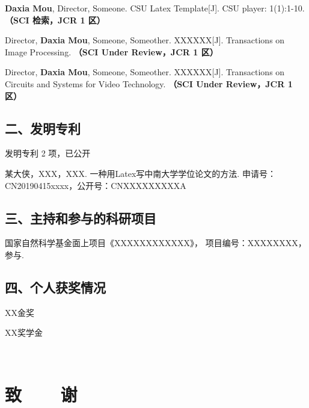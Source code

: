 \else
\begin{enumerate}[label={[\arabic*]},itemindent=2em,wide]
\item \textbf{Daxia Mou}, Director, Someone. CSU Latex Template[J]. CSU player: 1(1):1-10. {\bfseries \heiti（SCI 检索，JCR 1 区）}
\item Director, \textbf{Daxia Mou}, Someone, Someother. XXXXXX[J]. Transactions on Image Processing. {\bfseries \heiti（SCI Under Review，JCR 1 区）}
\item Director, \textbf{Daxia Mou}, Someone, Someother. XXXXXX[J]. Transactions on Circuits and Systems for Video Technology. {\bfseries \heiti（SCI Under Review，JCR 1 区）}
\end{enumerate}
\fi

\vspace{22pt}
\subsection*{二、发明专利}
\ifblindreview
发明专利 2 项，已公开
\else
\begin{enumerate}[label={[\arabic*]},itemindent=2em,wide]
\item 某大侠，XXX，XXX. 一种用Latex写中南大学学位论文的方法. 申请号：CN20190415xxxx，公开号：CNXXXXXXXXXA
\end{enumerate}
\fi

\ifblindreview
\else

\vspace{22pt}
\subsection*{三、主持和参与的科研项目}
\begin{enumerate}[label={[\arabic*]},itemindent=2em,wide]
\item 国家自然科学基金面上项目《XXXXXXXXXXXX》， 项目编号：XXXXXXXX，参与.
\end{enumerate}

\vspace{22pt}
\subsection*{四、个人获奖情况}
\begin{enumerate}[label={[\arabic*]},itemindent=2em,wide]
\item XX金奖
\item XX奖学金
\end{enumerate}
\fi

\newpage

\ifblindreview
\else
{}
{~}
\vspace{-9pt}
\section{致~~~~谢} %
\lipsum
\newpage
\fi